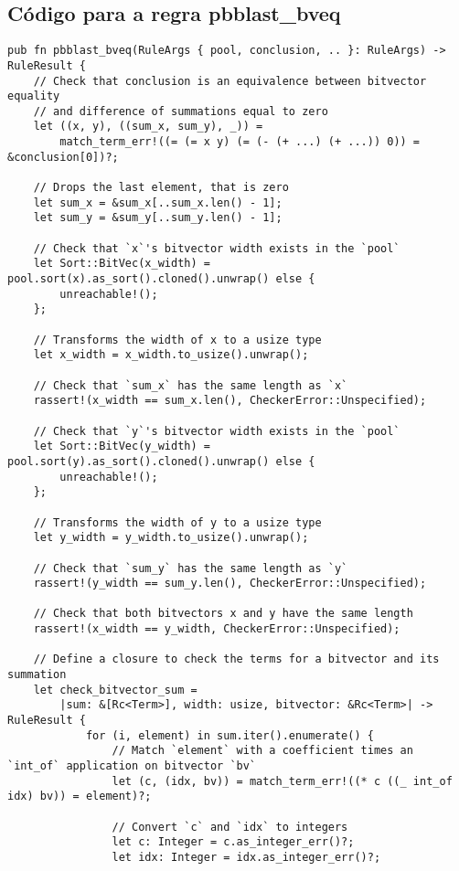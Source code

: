\documentclass[conference]{IEEEtran}
\begin{document}
\subsection{Código para a regra pbblast\_bveq}
\begin{verbatim}
pub fn pbblast_bveq(RuleArgs { pool, conclusion, .. }: RuleArgs) -> RuleResult {
    // Check that conclusion is an equivalence between bitvector equality
    // and difference of summations equal to zero
    let ((x, y), ((sum_x, sum_y), _)) =
        match_term_err!((= (= x y) (= (- (+ ...) (+ ...)) 0)) = &conclusion[0])?;

    // Drops the last element, that is zero
    let sum_x = &sum_x[..sum_x.len() - 1];
    let sum_y = &sum_y[..sum_y.len() - 1];

    // Check that `x`'s bitvector width exists in the `pool`
    let Sort::BitVec(x_width) = pool.sort(x).as_sort().cloned().unwrap() else {
        unreachable!();
    };

    // Transforms the width of x to a usize type
    let x_width = x_width.to_usize().unwrap();

    // Check that `sum_x` has the same length as `x`
    rassert!(x_width == sum_x.len(), CheckerError::Unspecified);

    // Check that `y`'s bitvector width exists in the `pool`
    let Sort::BitVec(y_width) = pool.sort(y).as_sort().cloned().unwrap() else {
        unreachable!();
    };

    // Transforms the width of y to a usize type
    let y_width = y_width.to_usize().unwrap();

    // Check that `sum_y` has the same length as `y`
    rassert!(y_width == sum_y.len(), CheckerError::Unspecified);

    // Check that both bitvectors x and y have the same length
    rassert!(x_width == y_width, CheckerError::Unspecified);

    // Define a closure to check the terms for a bitvector and its summation
    let check_bitvector_sum =
        |sum: &[Rc<Term>], width: usize, bitvector: &Rc<Term>| -> RuleResult {
            for (i, element) in sum.iter().enumerate() {
                // Match `element` with a coefficient times an `int_of` application on bitvector `bv`
                let (c, (idx, bv)) = match_term_err!((* c ((_ int_of idx) bv)) = element)?;

                // Convert `c` and `idx` to integers
                let c: Integer = c.as_integer_err()?;
                let idx: Integer = idx.as_integer_err()?;


\end{verbatim}
\end{document}
